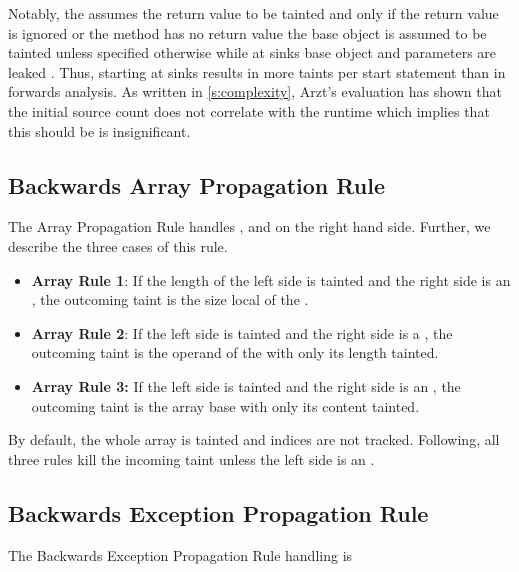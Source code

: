 \documentclass[../draft.tex]{subfiles}
\begin{document}
    Notably, the  assumes the return value to be tainted and only if the return value is ignored or the method has no return value the base object is assumed to be tainted unless specified otherwise while at sinks base object and parameters are leaked \cite{Arzt2017PhD}. Thus, starting at sinks results in more taints per start statement than in forwards analysis. As written in \autoref{s:complexity}, Arzt's evaluation has shown that the initial source count does not correlate with the runtime which implies that this should be is insignificant.
    

    \subsection{Backwards Array Propagation Rule}
    The Array Propagation Rule handles ,  and  on the right hand side. Further, we describe the three cases of this rule.

    \begin{itemize}
        \item \textbf{Array Rule 1}: If the length of the left side is tainted and the right side is an , the outcoming taint is the size local of the .
        \item  \textbf{Array Rule 2}: If the left side is tainted and the right side is a , the outcoming taint is the operand of the  with only its length tainted.
        \item \textbf{Array Rule 3:} If the left side is tainted and the right side is an , the outcoming taint is the array base with only its content tainted.
    \end{itemize}

    By default, the whole array is tainted and indices are not tracked. Following, all three rules kill the incoming taint unless the left side is an . 

    \subsection{Backwards Exception Propagation Rule}
    The Backwards Exception Propagation Rule handling is
\end{document}
